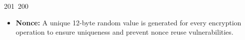 201~200~\documentclass{article}
\begin{document}
\begin{itemize}
	                                                                                                                                                                                                                                                                                                	                                                                                                                                        	    	                                                                                                	                                                                                                                                                                                                                                                                                                                                	                                                                        	                                                                        	                                                                                                                                        	                                                                                                                                                                                                                        	                                                                                                                            	                                                                	                                                                                            \item \textbf{Nonce:} A unique 12-byte random value is generated for every encryption operation to ensure uniqueness and prevent nonce reuse vulnerabilities.

\end{itemize}
\end{document}
